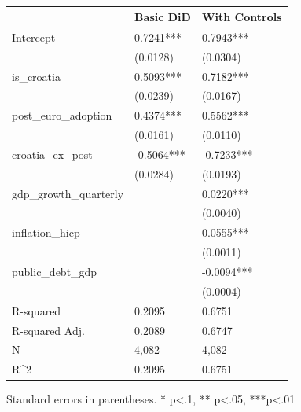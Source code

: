 \begin{table}
\caption{}
\label{}
\begin{center}
\begin{tabular}{lll}
\hline
                       & Basic DiD  & With Controls  \\
\hline
Intercept              & 0.7241***  & 0.7943***      \\
                       & (0.0128)   & (0.0304)       \\
is\_croatia            & 0.5093***  & 0.7182***      \\
                       & (0.0239)   & (0.0167)       \\
post\_euro\_adoption   & 0.4374***  & 0.5562***      \\
                       & (0.0161)   & (0.0110)       \\
croatia\_ex\_post      & -0.5064*** & -0.7233***     \\
                       & (0.0284)   & (0.0193)       \\
gdp\_growth\_quarterly &            & 0.0220***      \\
                       &            & (0.0040)       \\
inflation\_hicp        &            & 0.0555***      \\
                       &            & (0.0011)       \\
public\_debt\_gdp      &            & -0.0094***     \\
                       &            & (0.0004)       \\
R-squared              & 0.2095     & 0.6751         \\
R-squared Adj.         & 0.2089     & 0.6747         \\
N                      & 4,082      & 4,082          \\
R^2                    & 0.2095     & 0.6751         \\
\hline
\end{tabular}
\end{center}
\end{table}
\bigskip
Standard errors in parentheses. \newline 
* p<.1, ** p<.05, ***p<.01